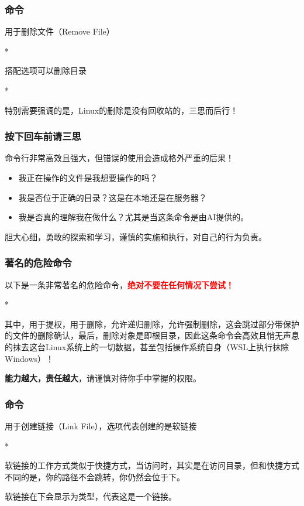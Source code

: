 \begin{frame}
    \frametitle{命令}
    用于删除文件（Remove File）
    \begin{Code}*
        
    \end{Code}
    搭配选项可以删除目录
    \begin{Code}*
        
    \end{Code}
    特别需要强调的是，Linux的删除是没有回收站的，三思而后行！
\end{frame}

\begin{frame}
    \frametitle{按下回车前请三思}
    命令行非常高效且强大，但错误的使用会造成格外严重的后果！
    \begin{itemize}
        \item 我正在操作的文件是我想要操作的吗？
        \item 我是否位于正确的目录？这是在本地还是在服务器？
        \item 我是否真的理解我在做什么？尤其是当这条命令是由AI提供的。
    \end{itemize}
    胆大心细，勇敢的探索和学习，谨慎的实施和执行，对自己的行为负责。
\end{frame}

\begin{frame}
    \frametitle{著名的危险命令}
    以下是一条非常著名的危险命令，\textcolor{red}{\textbf{绝对不要在任何情况下尝试！}}
    \begin{Code}*
        
    \end{Code}
    其中，用于提权，用于删除，允许递归删除，允许强制删除，这会跳过部分带保护的文件的删除确认，最后，删除对象是\code{/}即根目录，因此这条命令会高效且悄无声息的抹去这台Linux系统上的一切数据，甚至包括操作系统自身（WSL上执行抹除Windows）！

    \textbf{能力越大，责任越大}，请谨慎对待你手中掌握的权限。
\end{frame}

\begin{frame}
    \frametitle{命令}
    用于创建链接（Link File），选项代表创建的是软链接
    \begin{Code}*
        
    \end{Code}
    软链接的工作方式类似于快捷方式，当访问时，其实是在访问目录，但和快捷方式不同的是，你的路径不会跳转，你仍然会位于下。

    软链接在下会显示为类型，代表这是一个链接。
\end{frame}

